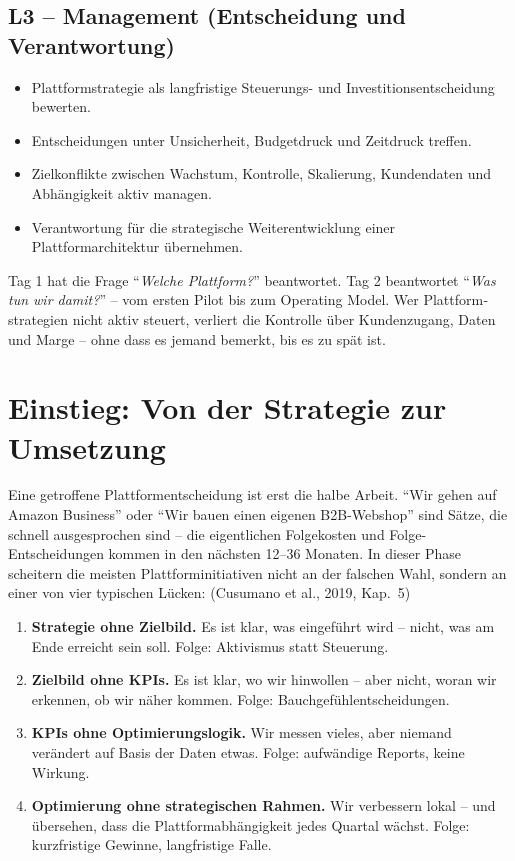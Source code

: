 \documentclass[11pt,a4paper,oneside]{article}
\newcommand{\fachbegriff}[1]{\textbf{#1}}
\newcommand{\quelle}[1]{{\footnotesize\color{lpGray}(#1)}}
\begin{document}
\subsection*{L3 -- Management (Entscheidung und Verantwortung)}
\begin{itemize}
  \item Plattformstrategie als langfristige Steuerungs- und Investitionsentscheidung bewerten.
  \item Entscheidungen unter Unsicherheit, Budgetdruck und Zeitdruck treffen.
  \item Zielkonflikte zwischen Wachstum, Kontrolle, Skalierung, Kundendaten und Abhängigkeit aktiv managen.
  \item Verantwortung für die strategische Weiterentwicklung einer Plattformarchitektur übernehmen.
\end{itemize}

\begin{merkbox}
Tag 1 hat die Frage ``\emph{Welche Plattform?}'' beantwortet. Tag 2 beantwortet ``\emph{Was tun wir damit?}'' -- vom ersten Pilot bis zum Operating Model. Wer Plattform­strategien nicht aktiv steuert, verliert die Kontrolle über Kundenzugang, Daten und Marge -- ohne dass es jemand bemerkt, bis es zu spät ist.
\end{merkbox}

\clearpage

\section{Einstieg: Von der Strategie zur Umsetzung}

Eine getroffene Plattform­entscheidung ist erst die halbe Arbeit. ``Wir gehen auf Amazon Business'' oder ``Wir bauen einen eigenen B2B-Webshop'' sind Sätze, die schnell ausgesprochen sind -- die eigentlichen Folgekosten und Folge-Entscheidungen kommen in den nächsten 12--36 Monaten. In dieser Phase scheitern die meisten Plattform­initiativen nicht an der falschen Wahl, sondern an einer von vier typischen Lücken: \quelle{Cusumano et al., 2019, Kap.~5}

\begin{enumerate}
  \item \fachbegriff{Strategie ohne Zielbild.} Es ist klar, was eingeführt wird -- nicht, was am Ende erreicht sein soll. Folge: Aktivismus statt Steuerung.
  \item \fachbegriff{Zielbild ohne KPIs.} Es ist klar, wo wir hinwollen -- aber nicht, woran wir erkennen, ob wir näher kommen. Folge: Bauchgefühl­entscheidungen.
  \item \fachbegriff{KPIs ohne Optimierungslogik.} Wir messen vieles, aber niemand verändert auf Basis der Daten etwas. Folge: aufwändige Reports, keine Wirkung.
  \item \fachbegriff{Optimierung ohne strategischen Rahmen.} Wir verbessern lokal -- und übersehen, dass die Plattform­abhängigkeit jedes Quartal wächst. Folge: kurzfristige Gewinne, langfristige Falle.
\end{enumerate}
\end{document}
